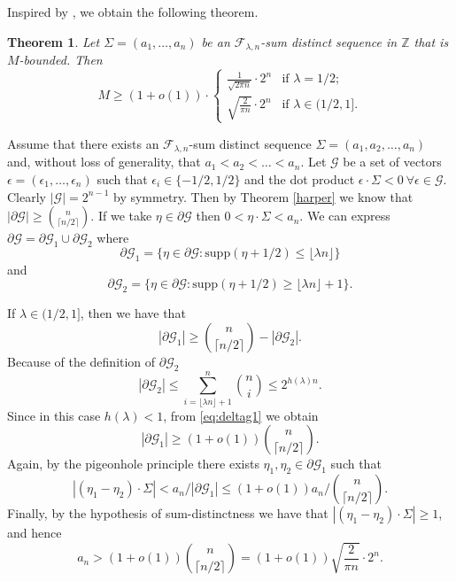 \documentclass[a4paper]{amsart}
\theoremstyle{plain}
\newtheorem{Theorem}[Definition]{Theorem}
\begin{document}
Inspired by \cite{Fox}, we obtain the following theorem.
\begin{Theorem}\label{harperbound}
Let $\Sigma=(a_1,\dots,a_n)$ be an
$\mathcal{F}_{\lambda,n}$-sum distinct sequence in $\mathbb{Z}$ that is $M$-bounded. Then
\begin{equation*}\label{eq:harpern2}
M \geq (1 + o(1)) \cdot \begin{cases} \frac{1}{\sqrt{2\pi n}} \cdot 2^n & \text{if } \lambda=1/2; \\ \sqrt{\frac{2}{\pi n}} \cdot 2^n &\text{if } \lambda \in (1/2, 1]. \end{cases}
\end{equation*}
\end{Theorem}
\proof
Assume that there exists an
$\mathcal{F}_{\lambda,n}$-sum distinct sequence $\Sigma=(a_1, a_2, \ldots, a_n)$ and, without loss of generality, that $a_1<a_2<\dots<a_n$.
Let $\mathcal{G}$ be a set of vectors $\epsilon = (\epsilon_1, \ldots, \epsilon_n)$ such that $\epsilon_i \in \{-1/2, 1/2\}$ and the dot product $\epsilon \cdot \Sigma <0\ \forall \epsilon\in \mathcal{G}$. Clearly $|\mathcal{G}| = 2^{n-1}$ by symmetry. Then by Theorem \ref{harper} we know that $|\partial \mathcal{G}| \geq \binom{n}{\lceil n/2 \rceil}$. If we take $\eta \in \partial \mathcal{G}$ then $0< \eta \cdot \Sigma < a_n$. We can express $\partial \mathcal{G} = \partial \mathcal{G}_1 \cup \partial \mathcal{G}_2$ where
$$\partial \mathcal{G}_1= \{ \eta \in\partial \mathcal{G} : \text{supp}(\eta +1/2) \leq \lfloor \lambda n \rfloor \}$$
and
$$\partial \mathcal{G}_2=\{ \eta \in \partial \mathcal{G} : \text{supp}(\eta +1/2) \geq \lfloor \lambda n \rfloor + 1 \}.$$

If $\lambda \in (1/2, 1]$, then we have that
\begin{equation}\label{eq:deltag1}
|\partial \mathcal{G}_1| \geq \binom{n}{\lceil n/2 \rceil} - |\partial \mathcal{G}_2|.
\end{equation}
Because of the definition of $\partial \mathcal{G}_2$
$$
|\partial \mathcal{G}_2| \leq \sum_{i=\lfloor \lambda n \rfloor+1}^n \binom{n}{i} \leq 2^{h(\lambda) n}.
$$
Since in this case $h(\lambda) < 1$, from \eqref{eq:deltag1} we obtain
$$
|\partial \mathcal{G}_1| \geq (1 + o(1))\binom{n}{\lceil n/2 \rceil}.
$$
Again, by the pigeonhole principle there exists $\eta_1, \eta_2 \in \partial \mathcal{G}_1$ such that
$$|(\eta_1 - \eta_2) \cdot \Sigma| <  a_n / |\partial \mathcal{G}_1| \leq (1 + o(1)) a_n / \binom{n}{\lceil n/2 \rceil}.$$
Finally, by the hypothesis of sum-distinctness we have that $|(\eta_1 - \eta_2) \cdot \Sigma| \geq 1$, and hence
$$ a_n>(1 + o(1))\binom{n}{\lceil n/2 \rceil}=(1 + o(1)) \sqrt{\frac{2}{\pi n}} \cdot 2^n.$$
\end{document}
